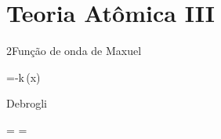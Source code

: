 \part{Teoria Atômica III}






\begin{sectionBox}2{Função de onda de Maxuel}
    \begin{BM}
        =-k\,\psi(x)
    \end{BM}
\end{sectionBox}


\begin{sectionBox}{Debrogli}

    \begin{BM}
        \lambda = =
    \end{BM}


\end{sectionBox}


